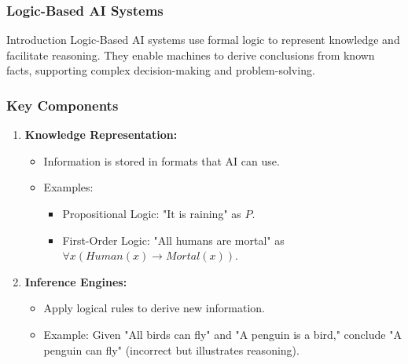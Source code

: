 \documentclass[aspectratio=169]{beamer}
\begin{document}
\begin{frame}[fragile]
    \frametitle{Logic-Based AI Systems}
    \begin{block}{Introduction}
        Logic-Based AI systems use formal logic to represent knowledge and facilitate reasoning. They enable machines to derive conclusions from known facts, supporting complex decision-making and problem-solving.
    \end{block}
\end{frame}

\begin{frame}[fragile]
    \frametitle{Key Components}
    \begin{enumerate}
        \item \textbf{Knowledge Representation:}
        \begin{itemize}
            \item Information is stored in formats that AI can use.
            \item Examples:
                \begin{itemize}
                    \item Propositional Logic: "It is raining" as \( P \).
                    \item First-Order Logic: "All humans are mortal" as \( \forall x (Human(x) \rightarrow Mortal(x)) \).
                \end{itemize}
        \end{itemize}
        
        \item \textbf{Inference Engines:}
        \begin{itemize}
            \item Apply logical rules to derive new information.
            \item Example: Given "All birds can fly" and "A penguin is a bird," conclude "A penguin can fly" (incorrect but illustrates reasoning).
        \end{itemize}
    \end{enumerate}
\end{frame}
\end{document}
